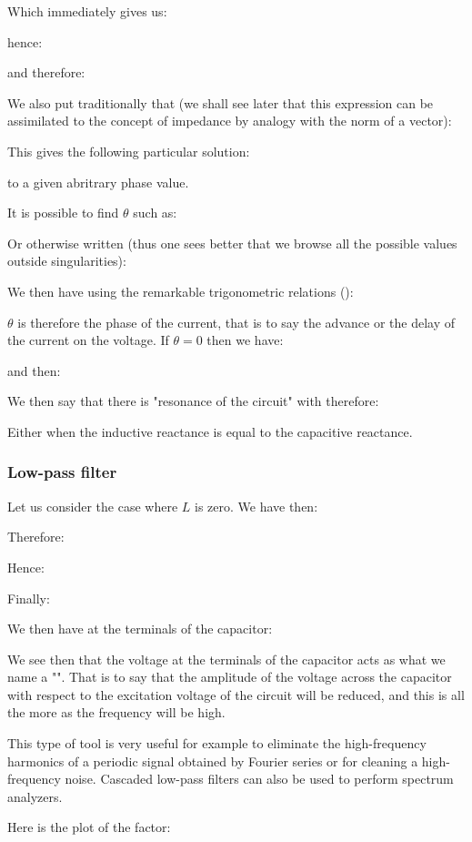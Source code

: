 	Which immediately gives us:
	
	hence:
	
	and therefore:
	
	We also put traditionally that (we shall see later that this expression can be assimilated to the concept of impedance by analogy with the norm of a vector):
	
	This gives the following particular solution:
	
	to a given abritrary phase value.
	
	It is possible to find $\theta$ such as:
	
	Or otherwise written (thus one sees better that we browse all the possible values outside singularities):
	
	We then have using the remarkable trigonometric relations ():
	
	$\theta$ is therefore the phase of the current, that is to say the advance or the delay of the current on the voltage. If $\theta=0$ then we have:
	
	and then:
	
	We then say that there is "resonance of the circuit" with therefore:
	
	Either when the inductive reactance is equal to the capacitive reactance.
	
	\subsubsection{Low-pass filter}
	Let us consider the case where $L$ is zero. We have then:
	
	Therefore:
	
	Hence:
	
	Finally:
	
	We then have at the terminals of the capacitor:
	
	We see then that the voltage at the terminals of the capacitor acts as what we name a "". That is to say that the amplitude of the voltage across the capacitor with respect to the excitation voltage of the circuit will be reduced, and this is all the more as the frequency will be high.

	This type of tool is very useful for example to eliminate the high-frequency harmonics of a periodic signal obtained by Fourier series or for cleaning a high-frequency noise. Cascaded low-pass filters can also be used to perform spectrum analyzers.

	Here is the plot of the factor:
	
